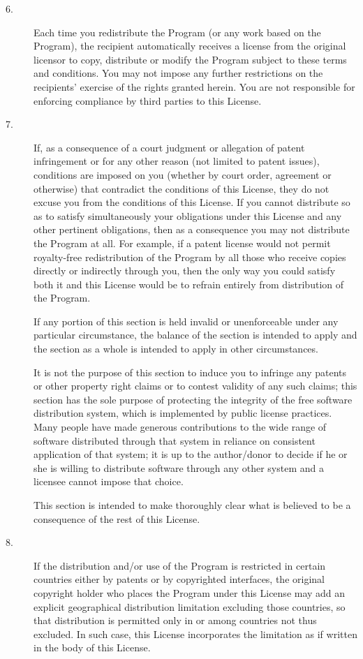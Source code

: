 \begin{description}
\item[6.] Each time you redistribute the Program (or  any work based on the
Program), the recipient automatically receives a license from the
original licensor to copy, distribute or modify the Program subject to
these terms and conditions.  You may not impose any further
restrictions on the recipients' exercise of the rights granted herein.
You are not responsible for enforcing compliance by third parties to
this License.

\item[7.] If, as a consequence of a court  judgment or allegation of patent
infringement or for any other reason (not limited to patent issues),
conditions are imposed on you (whether by court order, agreement or
otherwise) that contradict the conditions of this License, they do not
excuse you from the conditions of this License.  If you cannot
distribute so as to satisfy simultaneously your obligations under this
License and any other pertinent obligations, then as a consequence you
may not distribute the Program at all.  For example, if a patent
license would not permit royalty-free redistribution of the Program by
all those who receive copies directly or indirectly through you, then
the only way you could satisfy both it and this License would be to
refrain entirely from distribution of the Program.

If any portion of this section is held invalid or unenforceable under
any particular circumstance, the balance of the section is intended to
apply and the section as a whole is intended to apply in other
circumstances.

It is not the purpose of this section to induce you to infringe any
patents or other property right claims or to contest validity of any
such claims; this section has the sole purpose of protecting the
integrity of the free software distribution system, which is
implemented by public license practices.  Many people have made
generous contributions to the wide range of software distributed
through that system in reliance on consistent application of that
system; it is up to the author/donor to decide if he or she is willing
to distribute software through any other system and a licensee cannot
impose that choice.

This section is intended to make thoroughly clear what is believed to
be a consequence of the rest of this License.

\item[8.] If the distribution and/or use of the Program is restricted in
certain countries either by patents or by copyrighted interfaces, the
original copyright holder who places the Program under this License
may add an explicit geographical distribution limitation excluding
those countries, so that distribution is permitted only in or among
countries not thus excluded.  In such case, this License incorporates
the limitation as if written in the body of this License.


\end{description}
